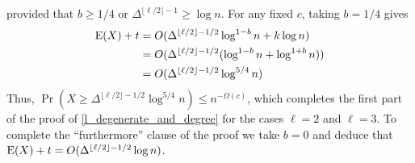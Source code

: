 \documentclass{patmorin}
\begin{document}
provided that $b\ge 1/4$ or $\Delta^{\lfloor\ell/2\rfloor-1}\ge\log n$.
For any fixed $c$, taking $b=1/4$ gives
\begin{align*}
  \mathrm{E}(X)+t
    & = O(\Delta^{\lfloor\ell/2\rfloor-1/2}\log^{1-b} n + k\log n) \\
    & = O(\Delta^{\lfloor\ell/2\rfloor-1/2}(\log^{1-b} n + \log^{1+b} n)) \\
    & = O(\Delta^{\lfloor\ell/2\rfloor-1/2}\log^{5/4} n)
\end{align*}
Thus, $\Pr(X\ge \Delta^{\lfloor\ell/2\rfloor-1/2}\log^{5/4} n) \le n^{-\Omega(c)}$, which completes the first part of the proof of \cref{l_degenerate_and_degree} for the cases $\ell=2$ and $\ell=3$.  To complete the ``furthermore'' clause of the proof we take $b=0$ and deduce that $\mathrm{E}(X)+t=O(\Delta^{\lfloor\ell/2\rfloor-1/2}\log n)$.



\end{document}
